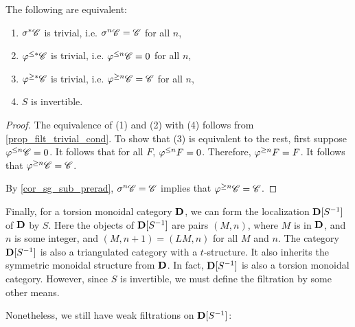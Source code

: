 \begin{cor}
The following are equivalent:
\begin{enumerate}
\item $\sigma^{*}\mathscr{C}$ is trivial, i.e. $\sigma^{n}\mathscr{C} = 
\mathscr{C}$ for all $n$,

\item $\varphi^{\leq *}\mathscr{C}$ is trivial, i.e. $\varphi^{\leq n}\mathscr{C} = 0$ 
for all $n$,

\item $\varphi^{\geq *}\mathscr{C}$ is trivial, i.e. $\varphi^{\geq n}\mathscr{C} = 
\mathscr{C}$ for all $n$,

\item $S$ is invertible.
\end{enumerate}
\end{cor}
\begin{proof}
The equivalence of (1) and (2) with (4) follows from 
\ref{prop_filt_trivial_cond}. To show that (3) is equivalent to
the rest, first suppose $\varphi^{\leq n}\mathscr{C} = 0$. It follows that 
for all $F$, $\varphi^{\leq n}F = 0$. Therefore, $\varphi^{\geq n}F = F$. It 
follows that $\varphi^{\geq n}\mathscr{C} = \mathscr{C}$.

By \ref{cor_sg_sub_prerad}, $\sigma^{n}\mathscr{C} = \mathscr{C}$ implies
that $\varphi^{\geq n}\mathscr{C} = \mathscr{C}$.
\end{proof}

Finally, for a torsion monoidal category $\mathbf{D}$, we can form the
localization $\mathbf{D}[S^{-1}]$ of $\mathbf{D}$ by $S$. Here the objects of
$\mathbf{D}[S^{-1}]$ are pairs $(M, n)$, where $M$ is in $\mathbf{D}$, and $n$
is some integer, and $(M, n + 1) = (LM, n)$ for all $M$ and $n$.
The category $\mathbf{D}[S^{-1}]$ is also a triangulated category with a
$t$-structure. It also inherits the symmetric monoidal structure
from $\mathbf{D}$. In fact, $\mathbf{D}[S^{-1}]$ is also a torsion monoidal 
category. However, since $S$ is invertible, we must define the
filtration by some other means.

Nonetheless, we still have weak filtrations on $\mathbf{D}[S^{-1}]$:

